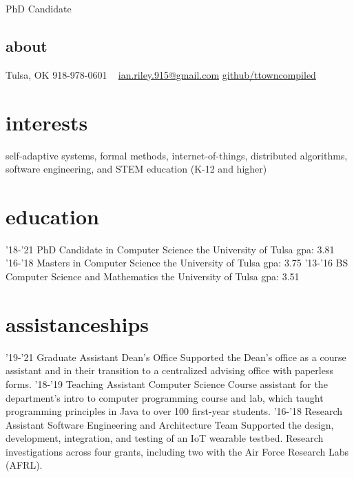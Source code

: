 \documentclass[print]{friggeri-cv}
\begin{document}
        {PhD Candidate}


  \begin{aside}
    \section{about}
      Tulsa, OK
      918-978-0601
      ~
      \href{mailto:ian.riley.915@gmail.com}{ian.riley.915@gmail.com}
      \href{https://github.com/ttowncompiled}{github/ttowncompiled}
  \end{aside}

  \section{interests}
  self-adaptive systems, formal methods, internet-of-things, distributed algorithms, software engineering, and STEM education (K-12 and higher)

  \section{education}

    \begin{entrylist}
      \entry
        {'18-'21}
        {PhD Candidate in Computer Science}
        {the University of Tulsa}
        {gpa: 3.81}
      \entry
        {'16-'18}
        {Masters in Computer Science}
        {the University of Tulsa}
        {gpa: 3.75}
      \entry
        {'13-'16}
        {BS Computer Science and Mathematics}
        {the University of Tulsa}
        {gpa: 3.51}
    \end{entrylist}

  \section{assistanceships}

    \begin{entrylist}
      \entry
        {'19-'21}
        {Graduate Assistant}
        {Dean's Office}
        {Supported the Dean's office as a course assistant and in their transition to a centralized advising office with paperless forms.}
      \entry
        {'18-'19}
        {Teaching Assistant}
        {Computer Science}
        {Course assistant for the department's intro to computer programming course and lab, which taught programming principles in Java to over 100 first-year students.}
      \entry
        {'16-'18}
        {Research Assistant}
        {Software Engineering and Architecture Team}
        {Supported the design, development, integration, and testing of an IoT wearable testbed. Research investigations across four grants, including two with the Air Force Research Labs (AFRL).}
    \end{entrylist}
\end{document}
